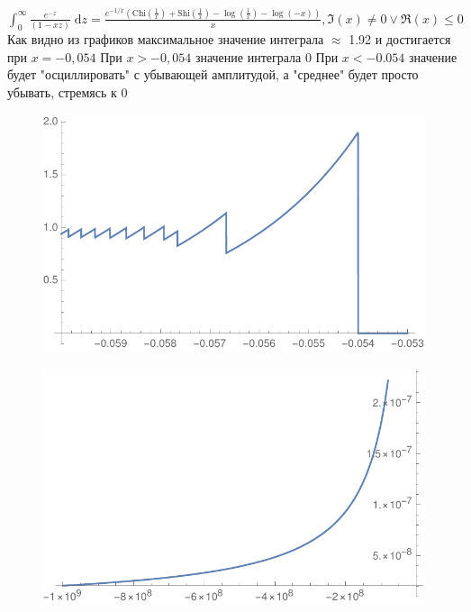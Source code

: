 \documentclass[10pt,a4paper]{article}
\begin{document}
$\int_0^\infty \frac{e^{-z}}{(1 - x z)}\;\mathrm{d}z = \frac{e^{-1/x} \left(\text{Chi}\left(\frac{1}{x}\right)+\text{Shi}\left(\frac{1}{x}\right)-\log \left(\frac{1}{x}\right)-\log (-x)\right)}{x},\Im(x)\neq 0\lor \Re(x)\leq 0$\\

Как видно из графиков максимальное значение интеграла $\approx$ 1.92 и достигается при $x=-0,054$
При $x>-0,054$ значение интеграла 0
При $x<-0.054$ значение будет "осциллировать" с убывающей амплитудой, а "среднее" будет просто убывать, стремясь к 0 
\begin{figure}[h]
\includegraphics{gr1}
\end{figure}

\begin{figure}[h]
\includegraphics{gr2}
\end{figure}
\end{document}
